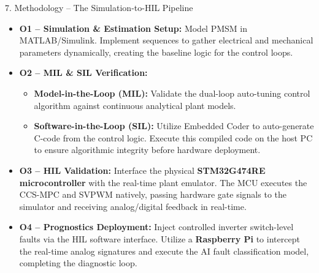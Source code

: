 \documentclass[aspectratio=169]{beamer}
\begin{document}
\begin{frame}{7. Methodology -- The Simulation-to-HIL Pipeline}
    \footnotesize
    \begin{itemize}
        \item \textbf{O1 -- Simulation \& Estimation Setup:} Model PMSM in MATLAB/Simulink. Implement sequences to gather electrical and mechanical parameters dynamically, creating the baseline logic for the control loops.
        \item \textbf{O2 -- MIL \& SIL Verification:}
        \begin{itemize}
            \footnotesize
            \item \textbf{Model-in-the-Loop (MIL):} Validate the dual-loop auto-tuning control algorithm against continuous analytical plant models.
            \item \textbf{Software-in-the-Loop (SIL):} Utilize Embedded Coder to auto-generate C-code from the control logic. Execute this compiled code on the host PC to ensure algorithmic integrity before hardware deployment.
        \end{itemize}
        \item \textbf{O3 -- HIL Validation:} Interface the physical \textbf{STM32G474RE microcontroller} with the real-time plant emulator. The MCU executes the CCS-MPC and SVPWM natively, passing hardware gate signals to the simulator and receiving analog/digital feedback in real-time.
        \item \textbf{O4 -- Prognostics Deployment:} Inject controlled inverter switch-level faults via the HIL software interface. Utilize a \textbf{Raspberry Pi} to intercept the real-time analog signatures and execute the AI fault classification model, completing the diagnostic loop.
    \end{itemize}
\end{frame}
\end{document}
